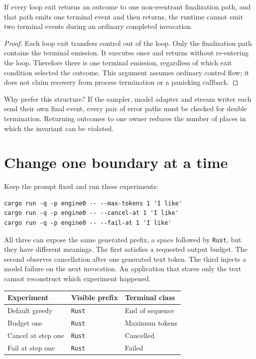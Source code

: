 \begin{proposition}
If every loop exit returns an outcome to one non-reentrant finalization path,
and that path emits one terminal event and then returns, the runtime cannot
emit two terminal events during an ordinary completed invocation.
\end{proposition}
\begin{proof}
Each loop exit transfers control out of the loop. Only the finalization path
contains the terminal emission. It executes once and returns without re-entering
the loop. Therefore there is one terminal emission, regardless of which exit
condition selected the outcome. This argument assumes ordinary control flow;
it does not claim recovery from process termination or a panicking callback.
\end{proof}

Why prefer this structure? If the sampler, model adapter and stream writer
each send their own final event, every pair of error paths must be checked for
double termination. Returning outcomes to one owner reduces the number of
places in which the invariant can be violated.

\section{Change one boundary at a time}
Keep the prompt fixed and run these experiments:
\begin{verbatim}
cargo run -q -p engine0 -- --max-tokens 1 'I like'
cargo run -q -p engine0 -- --cancel-at 1 'I like'
cargo run -q -p engine0 -- --fail-at 1 'I like'
\end{verbatim}
All three can expose the same generated prefix, a space followed by
\texttt{Rust}, but they have
different meanings. The first satisfies a requested output budget. The second
observes cancellation after one generated text token. The third injects a model
failure on the next invocation. An application that stores only the text cannot
reconstruct which experiment happened.

\begin{center}
\begin{tabular}{lll}
\toprule
Experiment & Visible prefix & Terminal class\\
\midrule
Default greedy & \texttt{Rust} & End of sequence\\
Budget one & \texttt{Rust} & Maximum tokens\\
Cancel at step one & \texttt{Rust} & Cancelled\\
Fail at step one & \texttt{Rust} & Failed\\
\bottomrule
\end{tabular}
\end{center}

